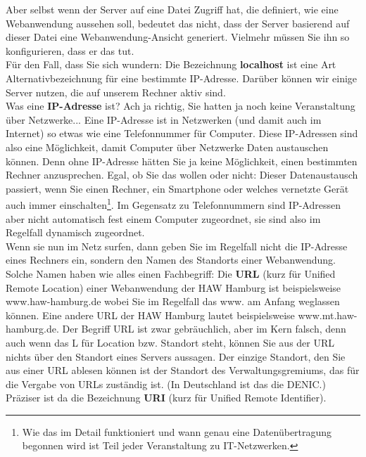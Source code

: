 Aber selbst wenn der Server auf eine Datei Zugriff hat, die definiert, wie eine Webanwendung aussehen soll, bedeutet das nicht, dass der Server basierend auf dieser Datei eine Webanwendung-Ansicht generiert. Vielmehr müssen Sie ihn so konfigurieren, dass er das tut.\\

Für den Fall, dass Sie sich wundern: Die Bezeichnung \textbf{localhost} ist eine Art Alternativbezeichnung für eine bestimmte IP-Adresse. Darüber können wir einige Server nutzen, die auf unserem Rechner aktiv sind.\\

Was eine \textbf{IP-Adresse} ist? Ach ja richtig, Sie hatten ja noch keine Veranstaltung über Netzwerke... Eine IP-Adresse ist in Netzwerken (und damit auch im Internet) so etwas wie eine Telefonnummer für Computer. Diese IP-Adressen sind also eine Möglichkeit, damit Computer über Netzwerke Daten austauschen können. Denn ohne IP-Adresse hätten Sie ja keine Möglichkeit, einen bestimmten Rechner anzusprechen. Egal, ob Sie das wollen oder nicht: Dieser Datenaustausch passiert, wenn Sie einen Rechner, ein Smartphone oder welches vernetzte Gerät auch immer einschalten\footnote{Wie das im Detail funktioniert und wann genau eine Datenübertragung begonnen wird ist Teil jeder Veranstaltung zu IT-Netzwerken.}. Im Gegensatz zu Telefonnummern sind IP-Adressen aber nicht automatisch fest einem Computer zugeordnet, sie sind also im Regelfall dynamisch zugeordnet.\\

Wenn sie nun im Netz surfen, dann geben Sie im Regelfall nicht die IP-Adresse eines Rechners ein, sondern den \glqq{}Namen\grqq{} des Standorts einer Webanwendung. Solche Namen haben wie alles einen Fachbegriff: Die \textbf{URL} (kurz für Unified Remote Location) einer Webanwendung der HAW Hamburg ist beispielsweise www.haw-hamburg.de wobei Sie im Regelfall das www. am Anfang weglassen können. Eine andere URL der HAW Hamburg lautet beispielsweise www.mt.haw-hamburg.de. Der Begriff URL ist zwar gebräuchlich, aber im Kern falsch, denn auch wenn das L für Location bzw. Standort steht, können Sie aus der URL nichts über den Standort eines Servers aussagen. Der einzige Standort, den Sie aus einer URL ablesen können ist der Standort des Verwaltungsgremiums, das für die Vergabe von URLs zuständig ist. (In Deutschland ist das die DENIC.) Präziser ist da die Bezeichnung \textbf{URI} (kurz für Unified Remote Identifier).\\

